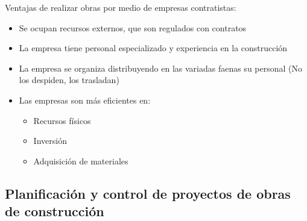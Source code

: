 \documentclass{article} %
\begin{document}
Ventajas de realizar obras por medio de empresas contratistas:
\begin{itemize}[label={},left=0pt,align=parleft]
    \item \begin{highlightbox}[levelone] Se ocupan recursos externos, que son regulados con contratos \end{highlightbox}
    \item \begin{highlightbox}[levelone] La empresa tiene personal especializado y experiencia en la construcción \end{highlightbox}
    \item \begin{highlightbox}[levelone] La empresa se organiza distribuyendo en las variadas faenas su personal (No los despiden, los trasladan) \end{highlightbox}
    \item \begin{highlightbox}[levelone] Las empresas son más eficientes en: \end{highlightbox}
    \begin{itemize}[label={},left=1em,align=parleft]
        \item \begin{highlightbox}[leveltwo] Recursos físicos \end{highlightbox}
        \item \begin{highlightbox}[leveltwo] Inversión \end{highlightbox}
        \item \begin{highlightbox}[leveltwo] Adquisición de materiales \end{highlightbox}
    \end{itemize}
\end{itemize}

\newpage

\subsection{Planificación y control de proyectos de obras de construcción}
\end{document}
